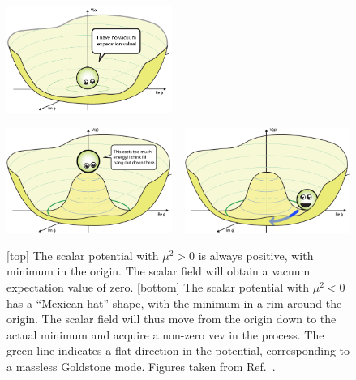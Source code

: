 \begin{figure}[htb]
  \centering
  \includegraphics[width=0.48\textwidth]{figures/standardmodel/BoringPotential}
  
  \vspace{2eM}
  
  \includegraphics[width=0.48\textwidth]{figures/standardmodel/Higgs-Potential-lookdown}
  ~
  \includegraphics[width=0.48\textwidth]{figures/standardmodel/Higgs-Potential-Goldstone}
  \caption{ [top] The scalar potential with $\mu^2 > 0$ is always positive, with minimum in the
origin. The scalar field will obtain a vacuum expectation value of zero. 
  [bottom] The scalar potential with $\mu^2 < 0$ has a ``Mexican hat'' shape, with the minimum in a
rim around the origin. The scalar field will thus move from the origin down to the actual minimum
and acquire a non-zero vev in the process. The green line indicates a flat direction in the
potential,
corresponding to a massless Goldstone mode.
  Figures taken from Ref.~\cite{Higgs_potential}.
  \label{fig:Higgs_potential}}
\end{figure}

